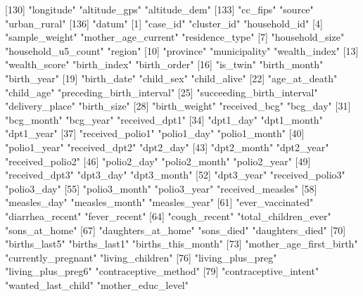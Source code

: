 [130] "longitude"                 "altitude_gps"              "altitude_dem"             
[133] "cc_fips"                   "source"                    "urban_rural"              
[136] "datum"                    
  [1] "case_id"                   "cluster_id"                "household_id"             
  [4] "sample_weight"             "mother_age_current"        "residence_type"           
  [7] "household_size"            "household_u5_count"        "region"                   
 [10] "province"                  "municipality"              "wealth_index"             
 [13] "wealth_score"              "birth_index"               "birth_order"              
 [16] "is_twin"                   "birth_month"               "birth_year"               
 [19] "birth_date"                "child_sex"                 "child_alive"              
 [22] "age_at_death"              "child_age"                 "preceding_birth_interval" 
 [25] "succeeding_birth_interval" "delivery_place"            "birth_size"               
 [28] "birth_weight"              "received_bcg"              "bcg_day"                  
 [31] "bcg_month"                 "bcg_year"                  "received_dpt1"            
 [34] "dpt1_day"                  "dpt1_month"                "dpt1_year"                
 [37] "received_polio1"           "polio1_day"                "polio1_month"             
 [40] "polio1_year"               "received_dpt2"             "dpt2_day"                 
 [43] "dpt2_month"                "dpt2_year"                 "received_polio2"          
 [46] "polio2_day"                "polio2_month"              "polio2_year"              
 [49] "received_dpt3"             "dpt3_day"                  "dpt3_month"               
 [52] "dpt3_year"                 "received_polio3"           "polio3_day"               
 [55] "polio3_month"              "polio3_year"               "received_measles"         
 [58] "measles_day"               "measles_month"             "measles_year"             
 [61] "ever_vaccinated"           "diarrhea_recent"           "fever_recent"             
 [64] "cough_recent"              "total_children_ever"       "sons_at_home"             
 [67] "daughters_at_home"         "sons_died"                 "daughters_died"           
 [70] "births_last5"              "births_last1"              "births_this_month"        
 [73] "mother_age_first_birth"    "currently_pregnant"        "living_children"          
 [76] "living_plus_preg"          "living_plus_preg6"         "contraceptive_method"     
 [79] "contraceptive_intent"      "wanted_last_child"         "mother_educ_level"        
